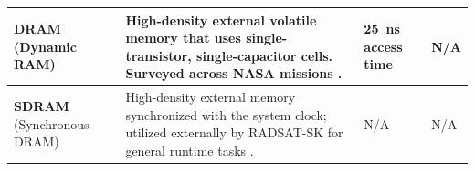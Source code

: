 \documentclass[10pt]{../datasheet}
\let\cite\citep
\begin{document}
\begin{longtable}{|p{2.8cm}|p{8.8cm}|p{2.1cm}|p{2.1cm}|}
  \textbf{DRAM} \newline (Dynamic RAM)                                                                                                                                                                                                          &
  High-density external volatile memory that uses single-transistor, single-capacitor cells. Surveyed across NASA missions \cite[p.~218]{nasa_soa_2022} \cite[p.~234]{nasa_soa_2023} \cite[p.~239]{nasa_soa_2024} \cite[p.~223]{nasa_soa_2026}. &
  25~ns access time \cite{nasa_soa_2026}                                                                                                                                                                                                        &
  N/A                                                                                                                                                                                                                                                                                                                                                        \\ \hline

  \textbf{SDRAM} \newline (Synchronous DRAM)                                                                                                                                                                                                    &
  High-density external memory synchronized with the system clock; utilized externally by RADSAT-SK for general runtime tasks \cite{radsat_sk_obc_git}.                                                                                         &
  N/A                                                                                                                                                                                                                                           &
  N/A                                                                                                                                                                                                                                                                                                                                                        \\ \hline


\end{longtable}
\end{document}
